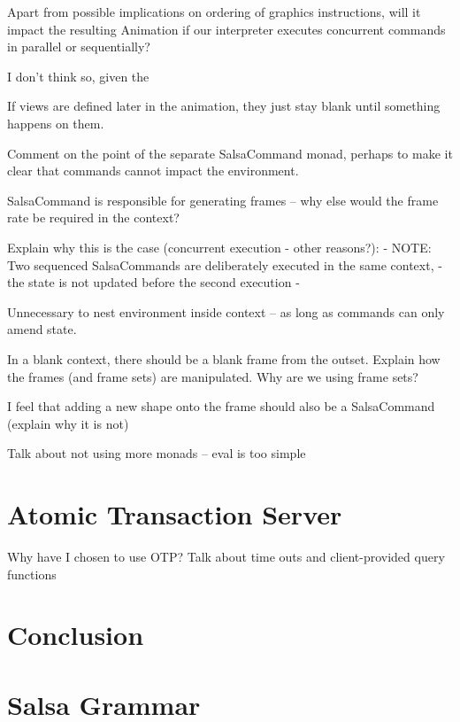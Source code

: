 \documentclass[
paper=a4,
oneside,
fontsize=11pt,
numbers=noenddot,
headinclude=false, %
footinclude=false, %
fleqn,             %
DIV=8
]{scrartcl}
\begin{document}
Apart from possible implications on ordering of graphics instructions, will it
impact the resulting Animation if our interpreter executes concurrent commands
in parallel or sequentially?

I don't think so, given the 

If views are defined later in the animation, they just stay blank until
something happens on them.

Comment on the point of the separate SalsaCommand monad, perhaps to make it
clear that commands cannot impact the environment.

SalsaCommand is responsible for generating frames -- why else would the frame
rate be required in the context?

Explain why this is the case (concurrent execution - other reasons?):
{- NOTE: Two sequenced SalsaCommands are deliberately executed in the same context,
 - the state is not updated before the second execution -}

Unnecessary to nest environment inside context -- as long as commands can only
amend state.

In a blank context, there should be a blank frame from the outset. Explain how
the frames (and frame sets) are manipulated.  Why are we using frame sets?

I feel that adding a new shape onto the frame should also be a SalsaCommand
(explain why it is not)

Talk about not using more monads -- eval is too simple

\section{Atomic Transaction Server}

Why have I chosen to use OTP?
Talk about time outs and client-provided query functions

\section{Conclusion}





\appendix

\section{Salsa Grammar}
\end{document}
